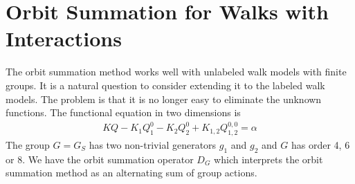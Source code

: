 
\chapter{Orbit Summation for Walks with Interactions}

The orbit summation method works well with unlabeled walk models with finite groups. It is a natural question to consider extending it to the labeled walk models. The problem is that it is no longer easy to eliminate the unknown functions. The functional equation in two dimensions is
\begin{align}
	KQ  - K_1 Q_1^0 -  K_2 Q_2^0 + K_{1,2}Q_{1,2}^{0,0} = \alpha
\end{align}
The group $G = G_S$ has two non-trivial generators $g_1$ and $g_2$ and $G$ has order 4, 6 or 8. We have the orbit summation operator $D_G$ which interprets the orbit summation method as an alternating sum of group actions.

